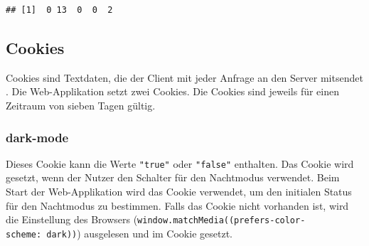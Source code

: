 \documentclass[
]{article}
\newenvironment{Shaded}{\begin{snugshade}}{\end{snugshade}}
\newcommand{\AttributeTok}[1]{\textcolor[rgb]{0.77,0.63,0.00}{#1}}
\newcommand{\CommentTok}[1]{\textcolor[rgb]{0.56,0.35,0.01}{\textit{#1}}}
\newcommand{\ControlFlowTok}[1]{\textcolor[rgb]{0.13,0.29,0.53}{\textbf{#1}}}
\newcommand{\DecValTok}[1]{\textcolor[rgb]{0.00,0.00,0.81}{#1}}
\newcommand{\FunctionTok}[1]{\textcolor[rgb]{0.00,0.00,0.00}{#1}}
\newcommand{\NormalTok}[1]{#1}
\newcommand{\OtherTok}[1]{\textcolor[rgb]{0.56,0.35,0.01}{#1}}
\newcommand{\SpecialCharTok}[1]{\textcolor[rgb]{0.00,0.00,0.00}{#1}}
\newcommand{\StringTok}[1]{\textcolor[rgb]{0.31,0.60,0.02}{#1}}
\begin{document}
\begin{Shaded}
\end{Shaded}

\begin{verbatim}
## [1]  0 13  0  0  2
\end{verbatim}

\hypertarget{cookies}{%
\subsection{Cookies}\label{cookies}}

Cookies sind Textdaten, die der Client mit jeder Anfrage an den Server mitsendet \autocite{cookies}. Die Web-Applikation setzt zwei Cookies. Die Cookies sind jeweils für einen Zeitraum von sieben Tagen gültig.

\hypertarget{dark-mode}{%
\subsubsection{dark-mode}\label{dark-mode}}

Dieses Cookie kann die Werte \texttt{"true"} oder \texttt{"false"} enthalten. Das Cookie wird gesetzt, wenn der Nutzer den Schalter für den Nachtmodus verwendet. Beim Start der Web-Applikation wird das Cookie verwendet, um den initialen Status für den Nachtmodus zu bestimmen. Falls das Cookie nicht vorhanden ist, wird die Einstellung des Browsers (\texttt{window.matchMedia(\textquotesingle{}(prefers-color-scheme:\ dark)\textquotesingle{})}) ausgelesen und im Cookie gesetzt.
\end{document}
